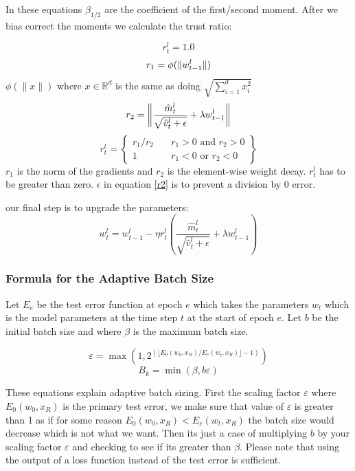 \documentclass[11pt]{article}
\DeclarePairedDelimiter\norm{\lVert}{\rVert}
\begin{document}
In these equations $\beta _{1/2}$ are the coefficient of the first/second moment. After we bias correct the moments we calculate the trust ratio:

\begin{equation*}
r^l_t = 1.0
\end{equation*}
\begin{equation*}
r_1 = \phi(\norm{w^l_{t-1}})
\end{equation*}
$\phi(\parallel x \parallel)$ where $x \in \mathbb{R}^d$ is the same as doing $\sqrt{\sum^d_{i=1} x_i^2}$
\begin{equation*}\label{r2}
r_2= \norm[\bigg]{\frac{\hat{m}^l_t}{\sqrt{\hat{v}^l_t + \epsilon}} + \lambda w^l_{t-1}}
\end{equation*}
\begin{equation*}
r^l_t =
\left\{
	\begin{array}{cc}
		r_1/r_2 & \quad r_1 > 0 \text{ and } r_2 > 0 \\
		1 & \quad r_1 < 0 \text{ or } r_2 < 0
	\end{array}
\right\}
\end{equation*}
$r_1$ is the norm of the gradients and $r_2$ is the element-wise weight decay. $r^l_t$ has to be greater than zero. $\epsilon$ in equation \ref{r2} is to prevent a division by 0 error.

our final step is to upgrade the parameters:
\begin{equation*}
w^l_t = w^l_{t-1} - \eta r^l_t  \left(\frac{\hat{m}^l_t}{\sqrt{\hat{v}^l_t + \epsilon}} 
+ \lambda w^l_{t-1}\right)
\end{equation*}



\subsubsection{Formula for the Adaptive Batch Size}

Let $E_e$ be the test error function at epoch $e$ which takes the parameters $w_t$ which is the model parameters at the time step $t$ at the start of epoch $e$. Let $b$ be the initial batch size and where $\beta$ is the maximum batch size.  

\begingroup
\Large
$$
\varepsilon = \max \left(1, 2^{(\lfloor E_0(w_0,x_R)/E_e(w_t, x_R) \rfloor -1)} \right)
$$
$$
B_k = \min \left(\beta,b\varepsilon\right)
$$
\endgroup

These equations explain adaptive batch sizing. First the scaling factor $\varepsilon$ where $E_0(w_0,x_R)$ is the primary test error, we make sure that value of $\varepsilon$ is greater than 1 as if for some reason $E_0(w_0,x_R) < E_e(w_t, x_R)$ the batch size would decrease which is not what we want. Then its just a case of multiplying $b$ by your scaling factor $\varepsilon$ and checking to see if its greater than $\beta$. Please note that using the output of a loss function instead of the test error is sufficient.
\end{document}
